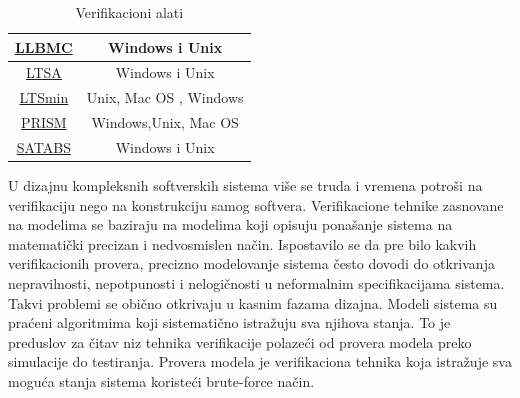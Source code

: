 \documentclass[a4paper]{article}
\begin{document}
{\begin{table}
\begin{center}
\begin{tabular}{||c c ||}
   \hline
 \href{http://llbmc.org/} {LLBMC} & Windows i Unix \\ 
    \hline
 \href{http://www.doc.ic.ac.uk/~jnm/book/} {LTSA} & Windows i Unix \\ 
     \hline
 \href{http://fmt.cs.utwente.nl/tools/ltsmin/} {LTSmin} & Unix, Mac OS , Windows \\
    \hline
 \href{https://en.wikipedia.org/wiki/PRISM_model_checker} {PRISM} &  Windows,Unix, Mac OS \\
   \hline
 \href{http://www.cprover.org/satabs/} {SATABS} &  Windows i Unix \\ [1ex]
 \hline
\end{tabular}
\caption{Verifikacioni alati \cite{wikiwebsite}}\label{tbl:vf}
\end {center}
\end {table}


\newpage


	U dizajnu kompleksnih softverskih sistema više se truda i vremena potroši na
	verifikaciju nego na konstrukciju samog softvera. Verifikacione tehnike  zasnovane na modelima se baziraju na modelima koji opisuju ponašanje sistema na matematički precizan i nedvosmislen način. Ispostavilo se da pre bilo kakvih verifikacionih provera, precizno modelovanje sistema često dovodi do otkrivanja nepravilnosti, nepotpunosti i nelogičnosti u neformalnim specifikacijama sistema. Takvi problemi se obično otkrivaju u kasnim fazama dizajna. Modeli sistema su praćeni algoritmima koji sistematično istražuju sva njihova stanja. To je preduslov za čitav niz tehnika verifikacije polazeći od provera modela preko simulacije do testiranja.
	Provera modela je verifikaciona tehnika koja istražuje sva moguća stanja sistema koristeći brute-force način.
	\newline

}
\end{document}
